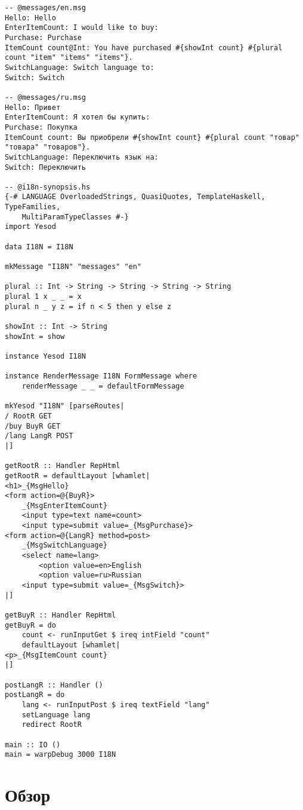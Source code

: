 \begin{lstlisting}
-- @messages/en.msg
Hello: Hello
EnterItemCount: I would like to buy: 
Purchase: Purchase
ItemCount count@Int: You have purchased #{showInt count} #{plural count "item" "items" "items"}.
SwitchLanguage: Switch language to: 
Switch: Switch

-- @messages/ru.msg
Hello: Привет
EnterItemCount: Я хотел бы купить: 
Purchase: Покупка
ItemCount count: Вы приобрели #{showInt count} #{plural count "товар" "товара" "товаров"}.
SwitchLanguage: Переключить язык на:
Switch: Переключить

-- @i18n-synopsis.hs
{-# LANGUAGE OverloadedStrings, QuasiQuotes, TemplateHaskell, TypeFamilies,
    MultiParamTypeClasses #-}
import Yesod

data I18N = I18N

mkMessage "I18N" "messages" "en"

plural :: Int -> String -> String -> String -> String
plural 1 x _ _ = x
plural n _ y z = if n < 5 then y else z

showInt :: Int -> String
showInt = show

instance Yesod I18N

instance RenderMessage I18N FormMessage where
    renderMessage _ _ = defaultFormMessage

mkYesod "I18N" [parseRoutes|
/ RootR GET
/buy BuyR GET
/lang LangR POST
|]

getRootR :: Handler RepHtml
getRootR = defaultLayout [whamlet|
<h1>_{MsgHello}
<form action=@{BuyR}>
    _{MsgEnterItemCount}
    <input type=text name=count>
    <input type=submit value=_{MsgPurchase}>
<form action=@{LangR} method=post>
    _{MsgSwitchLanguage}
    <select name=lang>
        <option value=en>English
        <option value=ru>Russian
    <input type=submit value=_{MsgSwitch}>
|]

getBuyR :: Handler RepHtml
getBuyR = do
    count <- runInputGet $ ireq intField "count"
    defaultLayout [whamlet|
<p>_{MsgItemCount count}
|]

postLangR :: Handler ()
postLangR = do
    lang <- runInputPost $ ireq textField "lang"
    setLanguage lang
    redirect RootR

main :: IO ()
main = warpDebug 3000 I18N
\end{lstlisting}

\section{Обзор} %

